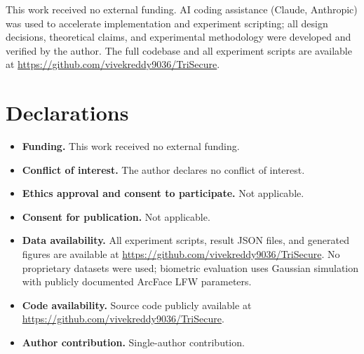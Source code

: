 \documentclass[pdflatex,sn-mathphys-num]{sn-jnl}%
\theoremstyle{thmstyleone}%
\theoremstyle{thmstyletwo}%
\theoremstyle{thmstylethree}%
\begin{document}
\backmatter


This work received no external funding. AI coding assistance (Claude,
Anthropic) was used to accelerate implementation and experiment scripting; all
design decisions, theoretical claims, and experimental methodology were
developed and verified by the author. The full codebase and all experiment
scripts are available at \url{https://github.com/vivekreddy9036/TriSecure}.

\section*{Declarations}

\begin{itemize}
\item \textbf{Funding.} This work received no external funding.
\item \textbf{Conflict of interest.} The author declares no conflict of
  interest.
\item \textbf{Ethics approval and consent to participate.} Not applicable.
\item \textbf{Consent for publication.} Not applicable.
\item \textbf{Data availability.} All experiment scripts, result JSON files,
  and generated figures are available at
  \url{https://github.com/vivekreddy9036/TriSecure}. No proprietary datasets
  were used; biometric evaluation uses Gaussian simulation with publicly
  documented ArcFace LFW parameters.
\item \textbf{Code availability.} Source code publicly available at
  \url{https://github.com/vivekreddy9036/TriSecure}.
\item \textbf{Author contribution.} Single-author contribution.
\end{itemize}


\end{document}
